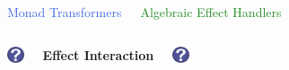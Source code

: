 \documentclass[xcolor=pdftex,dvipsnames,table]{beamer}
\def\questionmark{\includegraphics[height=0.5cm]{question_mark}}
\begin{document}
\begin{frame}
  \begin{columns}[c]
    \begin{center}
      \Large{\textcolor{RoyalBlue}{Monad Transformers}}
    \end{center}
    \begin{center}
      \Large{\textcolor{ForestGreen}{Algebraic Effect Handlers}}
    \end{center}
  \end{columns}
  \bigskip
  \bigskip
  \begin{columns}[c]
    \begin{center}
      \questionmark
    \end{center}
    \begin{center}
      \textbf{Effect Interaction}
    \end{center}
    \begin{center}
      \questionmark
    \end{center}
  \end{columns}
\end{frame}
\end{document}
